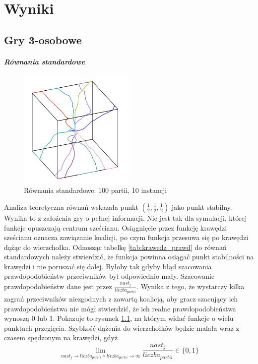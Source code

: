 \chapter{Wyniki}
\label{cha:wyniki}

\section{Gry 3-osobowe}
\label{sec:N3nzal}

\paragraph{Równania standardowe}
\label{sec:r_stan}
\begin{figure}
    \centering
    \includegraphics[width=0.5\textwidth]{pict/wyniki/stand100_10.png}   
    \caption{Równania standardowe: 100 partii, 10 instancji}
	\label{fig:stand100_10} 
\end{figure}

Analiza teoretyczna równań wskazała punkt $(\frac{1}{2},\frac{1}{2},\frac{1}{2})$ jako punkt stabilny. Wynika to z założenia gry o pełnej informacji. Nie jest tak dla symulacji, której funkcje opuszczają centrum sześcianu. Osiągnięcie przez funkcję krawędzi sześcianu oznacza zawiązanie koalicji, po czym funkcja przesuwa się po krawędzi dążąc do wierzchołka. Odnosząc tabelkę \ref{tab:krawedz_prawd} do równań standardowych należy stwierdzić, że funkcja powinna osiągać punkt stabilności na krawędzi i nie poruszać się dalej. Byłoby tak gdyby błąd szacowania prawdopodobieństw przeciwników był odpowiednio mały. Szacowanie prawdopodobieństw dane jest przez $\frac{nast_{j}}{liczba_{partii}}$. Wynika z tego, że wystarczy kilka zagrań przeciwników niezgodnych z zawartą koalicją, aby gracz szacujący ich prawdopodobieństwa nie mógł stwierdzić, że ich realne prawdopodobieństwa wynoszą 0 lub 1. Pokazuje to rysunek \ref{fig:stand100_10}, na którym widać funkcje o wielu punktach przegięcia. Szybkość dążenia do wierzchołków będzie malała wraz z czasem spędzonym na krawędzi, gdyż 
\[\lim_{nast_j\rightarrow liczba_{partii} \wedge liczba_{partii} \rightarrow \infty} \frac{nast_j}{liczba_{partii}} \in \{0,1\} \]

